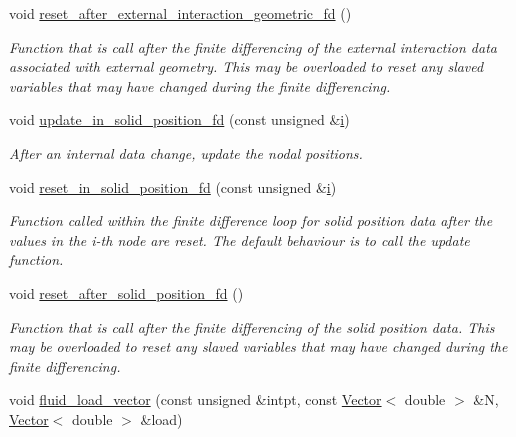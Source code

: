 \begin{DoxyCompactItemize}
void \hyperlink{classoomph_1_1FSIWallElement_ad1d147ea9d6f49f7d0507d783d7572e2}{reset\+\_\+after\+\_\+external\+\_\+interaction\+\_\+geometric\+\_\+fd} ()
\begin{DoxyCompactList}\small\item\em Function that is call after the finite differencing of the external interaction data associated with external geometry. This may be overloaded to reset any slaved variables that may have changed during the finite differencing. \end{DoxyCompactList}\item 
void \hyperlink{classoomph_1_1FSIWallElement_ae05300394e531c7b80dc44d1f5e1dbfe}{update\+\_\+in\+\_\+solid\+\_\+position\+\_\+fd} (const unsigned \&\hyperlink{cfortran_8h_adb50e893b86b3e55e751a42eab3cba82}{i})
\begin{DoxyCompactList}\small\item\em After an internal data change, update the nodal positions. \end{DoxyCompactList}\item 
void \hyperlink{classoomph_1_1FSIWallElement_aa7a250a0958768f5393484ea3c528a37}{reset\+\_\+in\+\_\+solid\+\_\+position\+\_\+fd} (const unsigned \&\hyperlink{cfortran_8h_adb50e893b86b3e55e751a42eab3cba82}{i})
\begin{DoxyCompactList}\small\item\em Function called within the finite difference loop for solid position data after the values in the i-\/th node are reset. The default behaviour is to call the update function. \end{DoxyCompactList}\item 
void \hyperlink{classoomph_1_1FSIWallElement_ae960e2a896fc81320f08cdbda6dc6526}{reset\+\_\+after\+\_\+solid\+\_\+position\+\_\+fd} ()
\begin{DoxyCompactList}\small\item\em Function that is call after the finite differencing of the solid position data. This may be overloaded to reset any slaved variables that may have changed during the finite differencing. \end{DoxyCompactList}\item 
void \hyperlink{classoomph_1_1FSIWallElement_a4b6eacec41f41006a3884ee0dbda3bcb}{fluid\+\_\+load\+\_\+vector} (const unsigned \&intpt, const \hyperlink{classoomph_1_1Vector}{Vector}$<$ double $>$ \&N, \hyperlink{classoomph_1_1Vector}{Vector}$<$ double $>$ \&load)

\end{DoxyCompactItemize}
